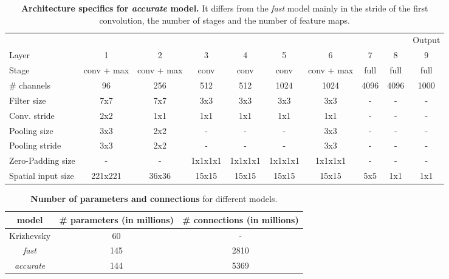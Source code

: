 \documentclass{article} %
\begin{document}
\begin{table}[h!]
\scriptsize
\begin{center}
\begin{tabular}{|l||c|c|c|c|c|c||c|c||c|}
  \hline  
         &     &   &   &   &   &   &   & & Output \\ 
  Layer  &   1 & 2 & 3 & 4 & 5 & 6 & 7 & 8 & 9 \\ \hline
  \hline
  Stage & conv + max & conv + max & conv & conv & conv & conv + max & full & full & full \\ \hline
  \# channels &   96 & 256        & 512  & 512  & 1024 & 1024 & 4096 & 4096  & 1000 \\ \hline
  Filter size &  7x7 & 7x7        & 3x3  & 3x3  & 3x3  & 3x3  & -    & -    & - \\ \hline
  Conv. stride &  2x2 & 1x1       & 1x1  & 1x1  & 1x1  & 1x1  & -    & -    & -  \\ \hline
  Pooling size &  3x3 & 2x2       & -    & -    & -    & 3x3  & -    & -    & -  \\ \hline
  Pooling stride& 3x3 & 2x2       & -    & -    & -    & 3x3  & -    & -    & -  \\ \hline
  Zero-Padding size &  - & - & 1x1x1x1 & 1x1x1x1 & 1x1x1x1 & 1x1x1x1 & - & - & -  \\ \hline
  Spatial input size & 221x221 & 36x36 & 15x15 & 15x15 & 15x15 & 15x15 &  5x5 & 1x1 & 1x1    \\ \hline
 
  \hline
\end{tabular}
\vspace*{2mm}
\caption{\textbf{Architecture specifics for {\em accurate} model.}
  It differs from the {\em fast} model mainly in the stride of the first convolution,
  the number of stages and the number of feature maps.}
\label{tab:arch2}
\end{center}
\end{table}

\begin{table}[h!]
\scriptsize
\begin{center}
\begin{tabular}{|c||c|c|}
  \hline  
  model & \# parameters (in millions) & \# connections (in millions) \\  \hline
  Krizhevsky & 60 & - \\ \hline
  {\em fast} & 145 & 2810 \\ \hline
  {\em accurate} & 144 & 5369 \\ \hline
\end{tabular}
\vspace*{2mm}
\caption{\textbf{Number of parameters and connections} for different models.}
\label{tab:connections}
\end{center}
\end{table}
\end{document}
